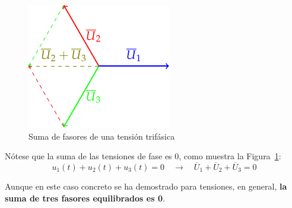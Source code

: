    \begin{figure}
		\centering
		\includegraphics{../figs/FasoresSumaCero.pdf}
		\caption{Suma de fasores de una tensión trifásica}
		\label{fig.fasoressumacero}
	\end{figure}

    \newpage

    \vspace*{3mm}
    Nótese que la suma de las tensiones de fase es 0, como muestra la Figura~\ref{fig.fasoressumacero}:
	\begin{equation*}
		u_1(t) + u_2(t) + u_3(t) = 0 \quad\rightarrow\quad \overline{U}_1 + \overline{U}_2 + \overline{U}_3 = 0
	\end{equation*}
	
	\begin{remark}
	    Aunque en este caso concreto se ha demostrado para tensiones, en general, \textbf{la suma de tres fasores equilibrados es 0}.
	\end{remark}
	
